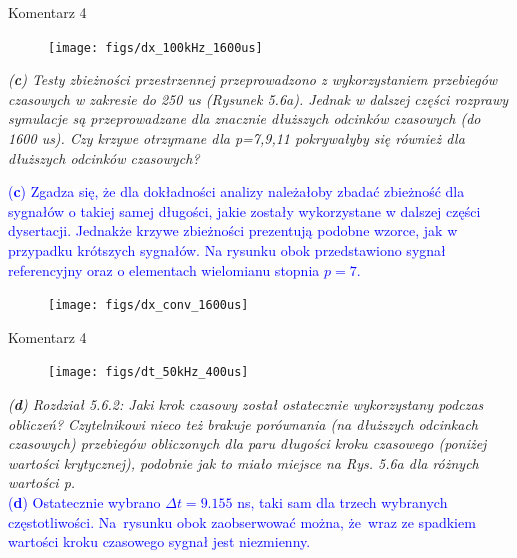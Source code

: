 \documentclass[10pt,aspectratio=169]{beamer} %
\begin{document}
\begin{frame}[label=frame8]{Komentarz 4}\justifying
	\begin{figure}
		\centering
		\texttt{[image: figs/dx\_100kHz\_1600us]}
		\label{fig:conv_x}
	\end{figure}
\textit{(\textbf{c}) Testy zbieżności przestrzennej przeprowadzono z wykorzystaniem przebiegów czasowych w zakresie do 250 us (Rysunek 5.6a). Jednak w dalszej części rozprawy symulacje są przeprowadzane dla znacznie dłuższych odcinków czasowych (do 1600 us). Czy krzywe otrzymane dla p=7,9,11 pokrywałyby się również dla dłuższych odcinków czasowych?}

\textcolor{blue}{(\textbf{c}) Zgadza się, że dla dokładności analizy należałoby zbadać zbieżność dla sygnałów o takiej samej długości, jakie zostały wykorzystane w dalszej części dysertacji. Jednakże krzywe zbieżności prezentują podobne wzorce, jak w przypadku krótszych sygnałów. Na rysunku obok przedstawiono sygnał referencyjny oraz o elementach wielomianu stopnia \(p=7\).}
\end{frame}
\begin{frame}
	\begin{figure}
		\centering
		\texttt{[image: figs/dx\_conv\_1600us]}
	\end{figure}
\end{frame}
\begin{frame}[label=frame9]{Komentarz 4}\justifying
\begin{figure}
	\centering
	\texttt{[image: figs/dt\_50kHz\_400us]}
\end{figure}

\textit{(\textbf{d}) Rozdział 5.6.2: Jaki krok czasowy został ostatecznie wykorzystany podczas obliczeń? Czytelnikowi nieco też brakuje porównania (na dłuższych odcinkach czasowych) przebiegów obliczonych dla paru długości kroku czasowego (poniżej wartości krytycznej), podobnie jak to miało miejsce na Rys. 5.6a dla różnych wartości p.}\\
\textcolor{blue}{(\textbf{d}) Ostatecznie wybrano \(\Delta t=9.155\) ns, taki sam dla trzech wybranych częstotliwości. Na~rysunku obok zaobserwować można, że~wraz ze spadkiem wartości kroku czasowego sygnał jest niezmienny.}
\end{frame}
\end{document}
